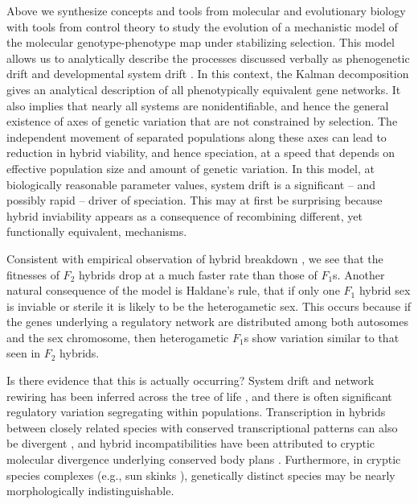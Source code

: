 \documentclass{article}
\newcommand{\plr}[1]{\todo[color=blue!25]{#1}}
\newcommand{\plr}[1]{{\color{blue}\it #1}}
\newcommand{\1}{\mathbbm{1}}
\begin{document}
Above we synthesize concepts and tools from molecular and evolutionary biology with tools from control theory
to study the evolution of a mechanistic model of the molecular genotype-phenotype map under stabilizing selection.
This model allows us to analytically describe the processes discussed verbally as
phenogenetic drift \citep{weiss2000phenogenetic} and developmental system drift \citep{true2001developmental}.
In this context, the Kalman decomposition \citep{kalman1963mathematical}
gives an analytical description of all phenotypically equivalent gene networks.
It also implies that nearly all systems are nonidentifiable,
and hence the general existence of axes of genetic variation that are not constrained by selection.
The independent movement of separated populations along these axes
can lead to reduction in hybrid viability, and hence speciation,
at a speed that depends on effective population size and amount of genetic variation. 
In this model, at biologically reasonable parameter values,
system drift is a significant -- and possibly rapid -- driver of speciation.
This may at first be surprising because
hybrid inviability appears as a consequence of recombining different, yet functionally equivalent, mechanisms. 

Consistent with empirical observation of hybrid breakdown \citep[e.g.][]{plotner2017chlorosis}, 
we see that the fitnesses of $F_2$ hybrids drop at a much faster rate than those of $F_1$s.
Another natural consequence of the model is Haldane's rule,
that if only one $F_1$ hybrid sex is inviable or sterile it is likely to be the heterogametic sex.
This occurs because if the genes underlying a regulatory network are distributed among both autosomes and the sex chromosome, 
then heterogametic $F_1$s show variation similar to that seen in $F_2$ hybrids.

Is there evidence that this is actually occurring?
System drift and network rewiring has been inferred across the tree of life \citep{wotton2015quantitative, crombach2016gap, dalal2017transcription, johnson2017rewiring, ali2017quantitative},
and there is often significant regulatory variation segregating within populations.
Transcription in hybrids between closely related species with conserved transcriptional patterns can also be divergent 
\citep{haerty2006gene, maheshwari2012cis, coolon2014tempo, michalak2004association, mack2016gene}, and hybrid incompatibilities have been attributed to cryptic molecular divergence underlying conserved body plans \citep{gavin2013embryonic}. 
Furthermore, in cryptic species complexes (e.g., sun skinks \citep{barley2013challenge}),
genetically distinct species
may be nearly morphologically indistinguishable.
\end{document}
